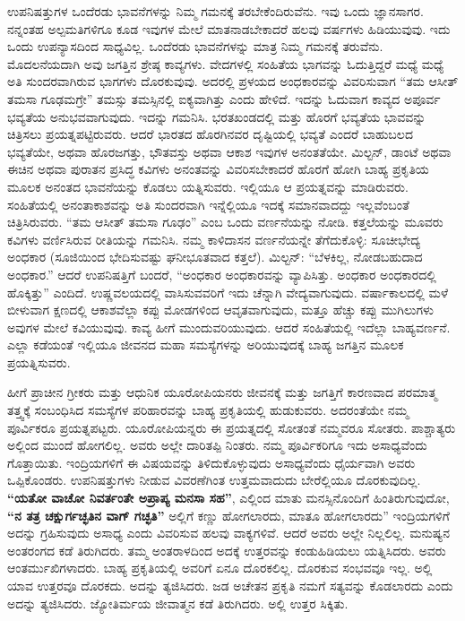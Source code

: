 ಉಪನಿಷತ್ತುಗಳ ಒಂದೆರಡು ಭಾವನೆಗಳನ್ನು ನಿಮ್ಮ ಗಮನಕ್ಕೆ ತರಬೇಕೆಂದಿರುವೆನು. ಇವು ಒಂದು ಜ್ಞಾನಸಾಗರ. ನನ್ನಂತಹ ಅಲ್ಪಮತಿಗಳಿಗೂ ಕೂಡ ಇವುಗಳ ಮೇಲೆ ಮಾತನಾಡಬೇಕಾದರೆ ಹಲವು ವರ್ಷಗಳು ಹಿಡಿಯುವುವು. ಇದು ಒಂದು ಉಪನ್ಯಾಸದಿಂದ ಸಾಧ್ಯವಿಲ್ಲ. ಒಂದೆರಡು ಭಾವನೆಗಳನ್ನು ಮಾತ್ರ ನಿಮ್ಮ ಗಮನಕ್ಕೆ ತರುವೆನು. ಮೊದಲನೆಯದಾಗಿ ಅವು ಜಗತ್ತಿನ ಶ್ರೇಷ್ಠ ಕಾವ್ಯಗಳು. ವೇದಗಳಲ್ಲಿ ಸಂಹಿತೆಯ ಭಾಗವನ್ನು ಓದುತ್ತಿದ್ದರೆ ಮಧ್ಯೆ ಮಧ್ಯೆ ಅತಿ ಸುಂದರವಾಗಿರುವ ಭಾಗಗಳು ದೊರಕುವುವು. ಅದರಲ್ಲಿ ಪ್ರಳಯದ ಅಂಧಕಾರವನ್ನು ವಿವರಿಸುವಾಗ “ತಮ ಆಸೀತ್​ ತಮಸಾ ಗೂಢಮಗ್ರೇ” ತಮಸ್ಸು ತಮಸ್ಸಿನಲ್ಲಿ ಐಕ್ಯವಾಗಿತ್ತು ಎಂದು ಹೇಳಿದೆ. ಇದನ್ನು ಓದುವಾಗ ಕಾವ್ಯದ ಅಪೂರ್ವ ಭವ್ಯತೆಯ ಅನುಭವವಾಗುವುದು. ಇದನ್ನು ಗಮನಿಸಿ. ಭರತಖಂಡದಲ್ಲಿ ಮತ್ತು ಹೊರಗೆ ಭವ್ಯತೆಯ ಭಾವವನ್ನು ಚಿತ್ರಿಸಲು ಪ್ರಯತ್ನಪಟ್ಟಿರುವರು. ಆದರೆ ಭಾರತದ ಹೊರಗಿನವರ ದೃಷ್ಟಿಯಲ್ಲಿ ಭವ್ಯತೆ ಎಂದರೆ ಬಾಹುಬಲದ ಭವ್ಯತೆಯೇ, ಅಥವಾ ಹೊರಜಗತ್ತು, ಭೌತವಸ್ತು ಅಥವಾ ಆಕಾಶ ಇವುಗಳ ಅನಂತತೆಯೇ. ಮಿಲ್ಟನ್​, ಡಾಂಟೆ ಅಥವಾ ಈಚಿನ ಅಥವಾ ಪುರಾತನ ಪ್ರಸಿದ್ಧ ಕವಿಗಳು ಅನಂತವನ್ನು ವಿವರಿಸಬೇಕಾದರೆ ಹೊರಗೆ ಹೋಗಿ ಬಾಹ್ಯ ಪ್ರಕೃತಿಯ ಮೂಲಕ ಅನಂತದ ಭಾವನೆಯನ್ನು ಕೊಡಲು ಯತ್ನಿಸುವರು. ಇಲ್ಲಿಯೂ ಆ ಪ್ರಯತ್ನವನ್ನು ಮಾಡಿರುವರು. ಸಂಹಿತೆಯಲ್ಲಿ ಅನಂತಾಕಾಶವನ್ನು ಅತಿ ಸುಂದರವಾಗಿ ಇನ್ನೆಲ್ಲಿಯೂ ಇದಕ್ಕೆ ಸಮಾನವಾದದ್ದು ಇಲ್ಲವೆಂಬಂತೆ ಚಿತ್ರಿಸಿರುವರು. “ತಮ ಆಸೀತ್​ ತಮಸಾ ಗೂಢಂ” ಎಂಬ ಒಂದು ವರ್ಣನೆಯನ್ನು ನೋಡಿ. ಕತ್ತಲೆಯನ್ನು ಮೂವರು ಕವಿಗಳು ವರ್ಣಿಸಿರುವ ರೀತಿಯನ್ನು ಗಮನಿಸಿ. ನಮ್ಮ ಕಾಳಿದಾಸನ ವರ್ಣನೆಯನ್ನೇ ತೆಗೆದುಕೊಳ್ಳಿ: ಸೂಚೀಭೇದ್ಯ ಅಂಧಕಾರ (ಸೂಜಿಯಿಂದ ಭೇದಿಸುವಷ್ಟು ಘನೀಭೂತವಾದ ಕತ್ತಲೆ). ಮಿಲ್ಟನ್​: “ಬೆಳಕಿಲ್ಲ, ನೋಡಬಹುದಾದ ಅಂಧಕಾರ.” ಆದರೆ ಉಪನಿಷತ್ತಿಗೆ ಬಂದರೆ, “ಅಂಧಕಾರ ಅಂಧಕಾರವನ್ನು ವ್ಯಾಪಿಸಿತ್ತು. ಅಂಧಕಾರ ಅಂಧಕಾರದಲ್ಲಿ ಹೊಕ್ಕಿತ್ತು” ಎಂದಿದೆ. ಉಷ್ಣವಲಯದಲ್ಲಿ ವಾಸಿಸುವವರಿಗೆ ಇದು ಚೆನ್ನಾಗಿ ವೇದ್ಯವಾಗುವುದು. ವರ್ಷಾಕಾಲದಲ್ಲಿ ಮಳೆ ಬೀಳುವಾಗ ಕ್ಷಣದಲ್ಲಿ ಆಕಾಶವೆಲ್ಲಾ ಕಪ್ಪು ಮೋಡಗಳಿಂದ ಆವೃತವಾಗುವುದು, ಮತ್ತೂ ಹೆಚ್ಚು ಕಪ್ಪು ಮುಗಿಲುಗಳು ಅವುಗಳ ಮೇಲೆ ಕವಿಯುವುವು. ಕಾವ್ಯ ಹೀಗೆ ಮುಂದುವರಿಯುವುದು. ಆದರೆ ಸಂಹಿತೆಯಲ್ಲಿ ಇದೆಲ್ಲಾ ಬಾಹ್ಯವರ್ಣನೆ. ಎಲ್ಲಾ ಕಡೆಯಂತೆ ಇಲ್ಲಿಯೂ ಜೀವನದ ಮಹಾ ಸಮಸ್ಯೆಗಳನ್ನು ಅರಿಯುವುದಕ್ಕೆ ಬಾಹ್ಯ ಜಗತ್ತಿನ ಮೂಲಕ ಪ್ರಯತ್ನಿಸುವರು.

\newpage

ಹೀಗೆ ಪ್ರಾಚೀನ ಗ್ರೀಕರು ಮತ್ತು ಆಧುನಿಕ ಯೂರೋಪಿಯನರು ಜೀವನಕ್ಕೆ ಮತ್ತು ಜಗತ್ತಿಗೆ ಕಾರಣವಾದ ಪರಮಾತ್ಮ ತತ್ತ್ವಕ್ಕೆ ಸಂಬಂಧಿಸಿದ ಸಮಸ್ಯೆಗಳ ಪರಿಹಾರವನ್ನು ಬಾಹ್ಯ ಪ್ರಕೃತಿಯಲ್ಲಿ ಹುಡುಕುವರು. ಅದರಂತೆಯೇ ನಮ್ಮ ಪೂರ್ವಿಕರೂ ಪ್ರಯತ್ನಪಟ್ಟರು. ಯೂರೋಪಿಯನ್ನರು ಈ ಪ್ರಯತ್ನದಲ್ಲಿ ಸೋತಂತೆ ನಮ್ಮವರೂ ಸೋತರು. ಪಾಶ್ಚಾತ್ಯರು ಅಲ್ಲಿಂದ ಮುಂದೆ ಹೋಗಲಿಲ್ಲ. ಅವರು ಅಲ್ಲೇ ದಾರಿತಪ್ಪಿ ನಿಂತರು. ನಮ್ಮ ಪೂರ್ವಿಕರಿಗೂ ಇದು ಅಸಾಧ್ಯವೆಂದು ಗೊತ್ತಾಯಿತು. ಇಂದ್ರಿಯಗಳಿಗೆ ಈ ವಿಷಯವನ್ನು ತಿಳಿದುಕೊಳ್ಳುವುದು ಅಸಾಧ್ಯವೆಂದು ಧೈರ್ಯವಾಗಿ ಅವರು ಒಪ್ಪಿಕೊಂಡರು. ಉಪನಿಷತ್ತುಗಳು ನೀಡುವ ವಿವರಣೆಗಿಂತ ಉತ್ತಮವಾದುದು ಬೇರೆಲ್ಲಿಯೂ ದೊರಕುವುದಿಲ್ಲ. \textbf{“ಯತೋ ವಾಚೋ ನಿವರ್ತಂತೇ ಅಪ್ರಾಪ್ಯ ಮನಸಾ ಸಹ”}, ಎಲ್ಲಿಂದ ಮಾತು ಮನಸ್ಸಿನೊಂದಿಗೆ ಹಿಂತಿರುಗುವುದೋ, \textbf{“ನ ತತ್ರ ಚಕ್ಷುರ್ಗಚ್ಛತಿನ ವಾಗ್​ ಗಚ್ಛತಿ”} ಅಲ್ಲಿಗೆ ಕಣ್ಣು ಹೋಗಲಾರದು, ಮಾತೂ ಹೋಗಲಾರದು” ಇಂದ್ರಿಯಗಳಿಗೆ ಅದನ್ನು ಗ್ರಹಿಸುವುದು ಅಸಾಧ್ಯ ಎಂದು ವಿವರಿಸುವ ಹಲವು ವಾಕ್ಯಗಳಿವೆ. ಆದರೆ ಅವರು ಅಲ್ಲೇ ನಿಲ್ಲಲಿಲ್ಲ. ಮನುಷ್ಯನ ಅಂತರಂಗದ ಕಡೆ ತಿರುಗಿದರು. ತಮ್ಮ ಅಂತರಾಳದಿಂದ ಅದಕ್ಕೆ ಉತ್ತರವನ್ನು ಕಂಡುಹಿಡಿಯಲು ಯತ್ನಿಸಿದರು. ಅವರು ಆಂತರ್ಮುಖಿಗಳಾದರು. ಬಾಹ್ಯ ಪ್ರಕೃತಿಯಲ್ಲಿ ಅವರಿಗೆ ಏನೂ ದೊರಕಲಿಲ್ಲ. ದೊರಕುವ ಸಂಭವವೂ ಇಲ್ಲ. ಅಲ್ಲಿ ಯಾವ ಉತ್ತರವೂ ದೊರಕದು. ಅದನ್ನು ತ್ಯಜಿಸಿದರು. ಜಡ ಅಚೇತನ ಪ್ರಕೃತಿ ನಮಗೆ ಸತ್ಯವನ್ನು ಕೊಡಲಾರದು ಎಂದು ಅದನ್ನು ತ್ಯಜಿಸಿದರು. ಜ್ಯೋತಿರ್ಮಯ ಜೀವಾತ್ಮನ ಕಡೆ ತಿರುಗಿದರು. ಅಲ್ಲಿ ಉತ್ತರ ಸಿಕ್ಕಿತು.

